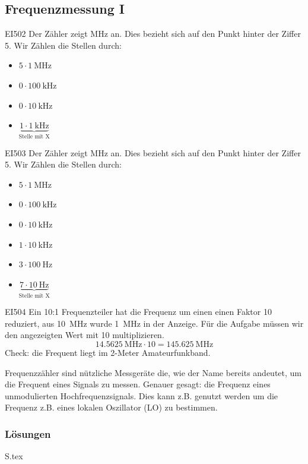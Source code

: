 \documentclass[10pt,a4paper,ngerman]{article}
\theoremstyle{definition}
\theoremstyle{plain}
\theoremstyle{mytheorem}
\theoremstyle{definition}
\newenvironment{ohmchapter}{}
{
  \subsubsection*{Lösungen}
  S\arabic{subsection}.tex}
}
\begin{document}
\subsection{Frequenzmessung I}


\begin{sol}{EI502}
Der Zähler zeigt MHz an. Dies bezieht sich auf den Punkt hinter der Ziffer 5.
Wir Zählen die Stellen durch:
\begin{itemize}
  \item $5 \cdot \SI{1} {\mega\hertz}$
  \item $0 \cdot \SI{100} {\kilo\hertz}$
  \item $0 \cdot \SI{10} {\kilo\hertz}$  
  \item  $\underbrace{1 \cdot \SI{1} {\kilo\hertz}}_{\text{Stelle mit X}}$
\end{itemize}
\end{sol} 

\begin{sol}{EI503}
Der Zähler zeigt MHz an. Dies bezieht sich auf den Punkt hinter der Ziffer 5.
Wir Zählen die Stellen durch:
\begin{itemize}
  \item $5 \cdot \SI{1} {\mega\hertz}$
  \item $0 \cdot \SI{100} {\kilo\hertz}$
  \item $0 \cdot \SI{10} {\kilo\hertz}$
  \item $1 \cdot \SI{10} {\kilo\hertz}$
  \item $3 \cdot \SI{100} {\hertz}$
  \item $\underbrace{7 \cdot \SI{10} {\hertz}}_{\text{Stelle mit X}}$
\end{itemize}
\end{sol} 

\begin{sol}{EI504}
 Ein 10:1 Frequenzteiler hat die Frequenz um einen einen Faktor 10 reduziert, aus \SI{10}{\mega\hertz} wurde \SI{1}{\mega\hertz} in der Anzeige.
 Für die Aufgabe müssen wir den angezeigten Wert mit 10 multiplizieren.
 $$ \SI{14,5625}{\mega\hertz} \cdot 10 = \SI{145,625}{\mega\hertz}$$
 Check: die Frequent liegt im 2-Meter Amateurfunkband.
\end{sol}  


\begin{ohmchapter}
Frequenzzähler sind nützliche Messgeräte die, wie der Name bereits andeutet, um die Frequent eines Signals zu messen. Genauer gesagt: die Frequenz eines unmodulierten Hochfrequenzsignals.  Dies kann z.B. genutzt werden um die Frequenz z.B. eines lokalen Oszillator (LO) zu bestimmen.  
\end{ohmchapter}  
\end{document}
